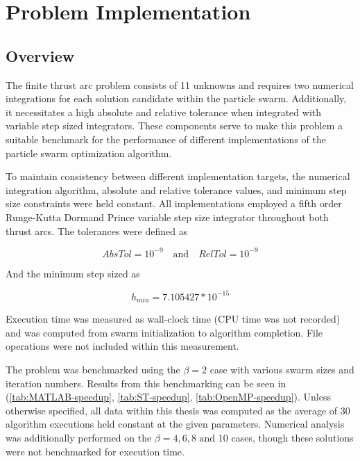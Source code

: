 \chapter{Problem Implementation}
\section{Overview}
\noindent The finite thrust arc problem consists of 11 unknowns and requires two numerical integrations for each solution candidate within the
particle swarm. Additionally, it necessitates a high absolute and relative tolerance when integrated with variable step sized integrators. These
components serve to make this problem a suitable benchmark for the performance of different implementations of the particle swarm optimization algorithm. \newline

\noindent To maintain consistency between different implementation targets, the numerical integration algorithm, absolute and relative tolerance values,
and minimum step size constraints were held constant. All implementations employed a fifth order Runge-Kutta Dormand Prince variable step size integrator
throughout both thrust arcs. The tolerances were defined as

\begin{equation}
AbsTol = 10^{-9} \quad \text{and} \quad RelTol = 10^{-9} 
\label{eq:tolerances}
\end{equation}

\noindent And the minimum step sized as 

\begin{equation}
    h_{min} = 7.105427*10^{-15}
    \label{eq:min-step-size}
\end{equation}

\noindent Execution time was measured as wall-clock time (CPU time was not recorded) and was computed from swarm initialization 
to algorithm completion. File operations were not included within this measurement. \newline

\noindent The problem was benchmarked using the $\beta = 2$ case with various swarm sizes and iteration numbers. 
Results from this benchmarking can be seen in (\ref{tab:MATLAB-speedup}, \ref{tab:ST-speedup}, \ref{tab:OpenMP-speedup}). Unless otherwise 
specified, all data within this thesis was computed as the average of 30 algorithm executions held constant at the given parameters. 
Numerical analysis was additionally performed on the $\beta=4,6,8 \text{ and } 10$ cases, though these solutions were not benchmarked for execution time.

